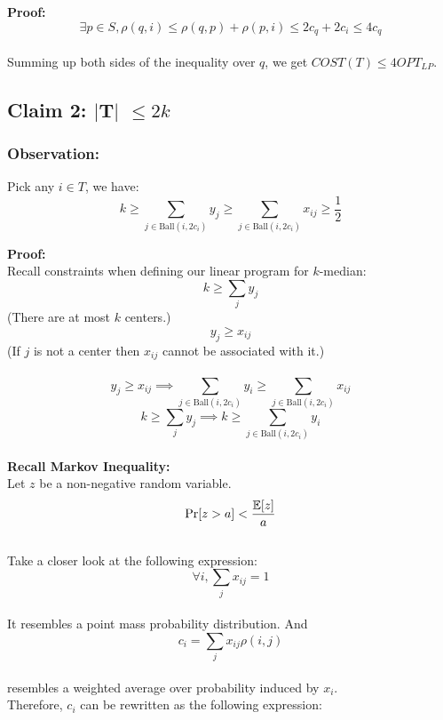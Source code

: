 \noindent\textbf{Proof:} \\
$$\exists p \in S, \rho(q, i) \leq \rho(q,p)+\rho(p, i)\leq 2c_q+2c_i \leq 4c_q$$ \\

\noindent Summing up both sides of the inequality over $q$, we get $COST(T) \leq 4 OPT_{LP}$.

\subsection*{Claim 2: $\mid$T$\mid$ $\leq 2k$} 
\subsubsection*{Observation:}
\noindent Pick any $i \in T$, we have:
$$k \geq \sum_{j \in \text{Ball}(i, 2c_i)}y_j \geq \sum_{j \in \text{Ball}(i, 2c_i)}x_{ij} \geq \frac{1}{2}$$

\noindent\textbf{Proof:} \\

\noindent Recall constraints when defining our linear program for $k$-median: \\
$$ k \geq \sum\limits_{j} y_j$$ (There are at most $k$ centers.)\\
$$ y_{j} \geq x_{ij}$$ (If $j$ is not a center then $x_{ij}$ cannot be associated with it.) \\ \\

\noindent $$ y_{j} \geq x_{ij} \implies \sum_{j \in \text{Ball}(i, 2c_i)}y_i \geq \sum_{j \in \text{Ball}(i, 2c_i)}x_{ij} $$
$$ k \geq \sum\limits_{j} y_j \implies k \geq \sum_{j \in \text{Ball}(i, 2c_i)}y_i $$ \\
\noindent\textbf{Recall Markov Inequality:} \\

\noindent Let $z$ be a non-negative random variable. \\
$$ \Pr[z > a] < \frac{\mathbb{E}[z]}{a} $$ \\ 

\noindent Take a closer look at the following expression: \\
$$ \forall i, \sum\limits_{j}x_{ij} = 1 $$ \\
\noindent It resembles a point mass probability distribution. And \\

\noindent $$ c_i = \sum\limits_{j}x_{ij}\rho(i,j) $$ \\
\noindent resembles a weighted average over probability induced by $x_i$.  \\ Therefore, $c_i$ can be rewritten as the following expression: \\

